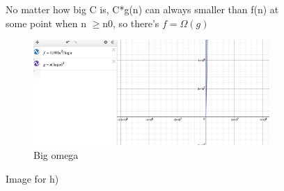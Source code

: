\documentclass{article}
\begin{document}
\begin{enumerate}[label=(\alph*)]
\begin{figure}[h]
\item %
No matter how big C is, C*g(n) can always smaller than f(n) at some point when n $\ge $n0, so there's $f = \Omega(g)$\\
    \begin{subfigure}{0.5\textwidth}
    \includegraphics[width=0.9\linewidth, height=4cm]{h.big omega.png}
    \caption{Big omega}
    \label{fig:subim1}
    \end{subfigure}
    \caption{Image for h)}
    \label{fig:image2}
    \end{figure}
    

\end{enumerate}
\end{document}
